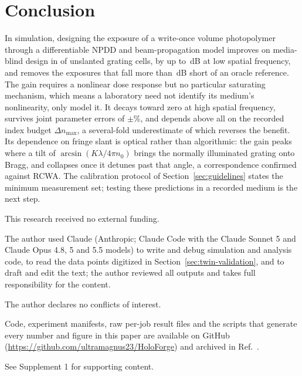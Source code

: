 \documentclass{optica-article}
\begin{document}
\section{Conclusion}
\label{sec:conclusion}
In simulation, designing the exposure of a write-once volume photopolymer
through a differentiable NPDD and beam-propagation model improves on
media-blind design in \MOneNPositive{} of \MOneNCells{} unslanted grating
cells, by up to \MaxGainEightX\,dB at low spatial frequency, and removes the
exposures that fall more than \WastedMediaThreshDB\,dB short of an oracle
reference. The gain requires a nonlinear dose response but no particular
saturating mechanism, which means a laboratory need not identify its medium's
nonlinearity, only model it. It decays toward zero at high spatial frequency,
survives joint parameter errors of $\pm$\SSixPctRange\%, and depends above all
on the recorded index budget $\Delta n_{\max}$, a several-fold underestimate of
which reverses the benefit. Its dependence on fringe slant is optical rather than
algorithmic: the gain peaks where a tilt of $\arcsin(K\lambda/4\pi n_0)$ brings
the normally illuminated grating onto Bragg, and collapses once it detunes past
that angle, a correspondence confirmed against RCWA. The calibration protocol
of Section~\ref{sec:guidelines} states the minimum measurement set; testing
these predictions in a recorded medium is the next step.

\begin{backmatter}

This research received no external funding.

The author used Claude (Anthropic; Claude Code with the Claude Sonnet 5 and
Claude Opus 4.8, 5 and 5.5 models) to write and debug simulation and analysis
code, to read the data points digitized in Section~\ref{sec:twin-validation},
and to draft and edit the text; the author reviewed all outputs and takes full
responsibility for the content.

The author declares no conflicts of interest.

Code, experiment manifests, raw per-job result files and the scripts that
generate every number and figure in this paper are available on GitHub
(\url{https://github.com/ultramagnus23/HoloForge}) and archived in
Ref.~\cite{holoforge2026code}.

See Supplement 1 for supporting content.

\end{backmatter}


\end{document}
